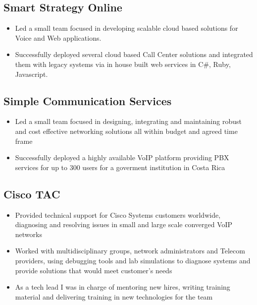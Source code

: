 \documentclass[11pt,a4paper,sans]{moderncv}   %
\begin{document}
\subsection{Smart Strategy Online}
  \begin{itemize}
  \item Led a small team focused in developing scalable cloud based solutions for Voice and Web applications.
  \item Successfully deployed several cloud based Call Center solutions and integrated them with legacy systems via in house built web services in C\#, Ruby, Javascript.
\end{itemize}
\subsection{Simple Communication Services}
\begin{itemize}
\item Led a small team focused in designing, integrating and maintaining robust and cost effective networking solutions all within budget and agreed time frame
\item Successfully deployed a highly available VoIP platform providing PBX services for up to 300 users for a goverment institution in Costa Rica
\end{itemize}
\subsection{Cisco TAC}
\begin{itemize}
\item Provided technical support for Cisco Systems customers worldwide, diagnosing and resolving issues in small and large scale converged VoIP networks
\item Worked with multidisciplinary groups, network administrators and Telecom providers, using debugging tools and lab simulations to diagnose systems and provide solutions that would meet customer's needs
\item As a tech lead I was in charge of mentoring new hires, writing training material and delivering training in new technologies for the team
\end{itemize}
\end{document}
